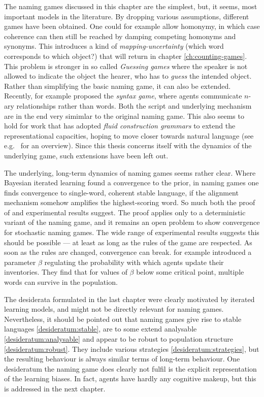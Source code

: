 \documentclass{../src/bcthesispart}
\begin{document}
The naming games discussed in this chapter are the simplest, but, it seems, most important models in the literature.
By dropping various assumptions, different games have been obtained. 
One could for example allow homonymy, in which case coherence can then still be reached by damping competing homonyms and synonyms.
This introduces a kind of \emph{mapping-uncertainty} \parencite{Wellens2012} (which word corresponds to which object?) that will return in chapter \ref{ch:counting-games}.
This problem is stronger in so called \emph{Guessing games} where the speaker is not allowed to indicate the object the hearer, who has to \emph{guess} the intended object.
Rather than simplifying the basic naming game, it can also be extended.
Recently, \textcite{Steels2015} for example proposed the \emph{syntax game}, where agents communicate $n$-ary relationships rather than words.
Both the script and underlying mechanism are in the end very simimlar to the original naming game.
This also seems to hold for work that has adopted \emph{fluid construction grammars} to extend the representational capacities, hoping to move closer towards natural language (see e.g.\ \textcite{Steels2016} for an overview).
Since this thesis concerns itself with the dynamics of the underlying game, such extensions have been left out.




The underlying, long-term dynamics of naming games seems rather clear.
Where Bayesian iterated learning found a convergence to the prior, in naming games one finds convergence to single-word, coherent stable language, if the alignment mechanism somehow amplifies the highest-scoring word.
So much both the proof of \textcite{DeVylder2006} and experimental results suggest.
The proof applies only to a deterministic variant of the naming game, and it remains an open problem to show convergence for stochastic naming games.
The wide range of experimental results suggests this should be possible — at least as long as the rules of the game are respected.
As soon as the rules are changed, convergence can break.
\textcite{Baronchelli2007} for example introduced a parameter $\beta$ regulating the probability with which agents update their inventories.
They find that for values of $\beta$ below some critical point, multiple words can survive in the population.




The desiderata formulated in the last chapter were clearly motivated by iterated learning models, and might not be directly relevant for naming games.
Nevertheless, it should be pointed out that naming games give rise to stable languages \ref{desideratum:stable}, are to some extend analysable \ref{desideratum:analysable} and appear to be robust to population structure \ref{desideratum:robust}.
They include various strategies \ref{desideratum:strategies}, but the resulting behaviour is always similar terms of long-term behaviour.
One desideratum the naming game does clearly not fulfil is the explicit representation of the learning biases. 
In fact, agents have hardly any cognitive makeup, but this is addressed in the next chapter.



\showbibliography
\end{document}
